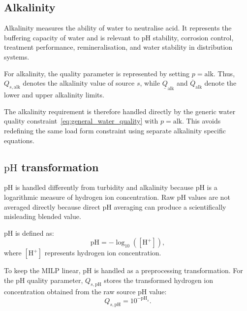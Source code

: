 \documentclass[10pt]{article}
\begin{document}
\subsection{Alkalinity}

Alkalinity measures the ability of water to neutralise acid. It represents the
buffering capacity of water and is relevant to $\mathrm{pH}$ stability,
corrosion control, treatment performance, remineralisation, and water stability
in distribution systems.

For alkalinity, the quality parameter is represented by setting
$p=\mathrm{alk}$. Thus, $Q_{s,\mathrm{alk}}$ denotes the alkalinity value of
source $s$, while $\underline{Q}_{\mathrm{alk}}$ and
$\overline{Q}_{\mathrm{alk}}$ denote the lower and upper alkalinity limits.

The alkalinity requirement is therefore handled directly by the generic water
quality constraint~\eqref{eq:general_water_quality} with $p=\mathrm{alk}$.
This avoids redefining the same load form constraint using separate
alkalinity specific equations.

\subsection{$\mathrm{pH}$ transformation}

$\mathrm{pH}$ is handled differently from turbidity and alkalinity because
$\mathrm{pH}$ is a logarithmic measure of hydrogen ion concentration. Raw
$\mathrm{pH}$ values are not averaged directly because direct $\mathrm{pH}$
averaging can produce a scientifically misleading blended value.

$\mathrm{pH}$ is defined as:
\begin{equation}\label{eq:ph_definition}
    \mathrm{pH} = -\log_{10}([\mathrm{H}^{+}]),
\end{equation}
where $[\mathrm{H}^{+}]$ represents hydrogen ion concentration.

To keep the MILP linear, $\mathrm{pH}$ is handled as a preprocessing
transformation. For the $\mathrm{pH}$ quality parameter,
$Q_{s,\mathrm{pH}}$ stores the transformed hydrogen ion concentration obtained
from the raw source $\mathrm{pH}$ value:
\begin{equation}\label{eq:ph_source_transformation}
    Q_{s,\mathrm{pH}} = 10^{-\mathrm{pH}_s}.
\end{equation}
\end{document}
